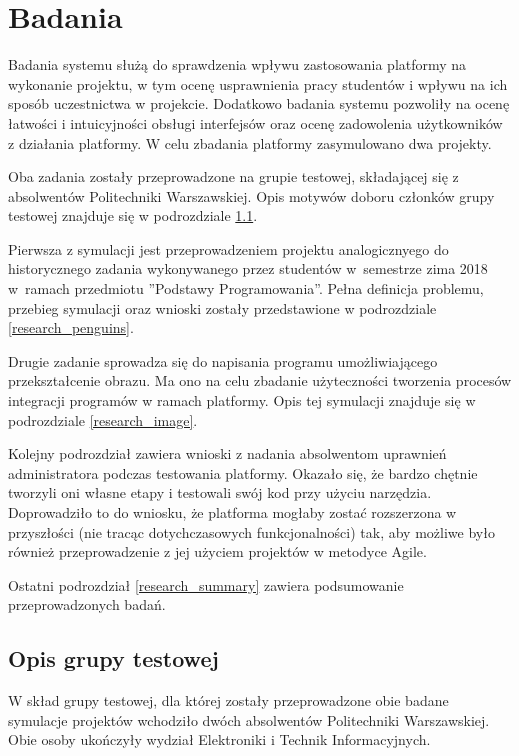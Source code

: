 \chapter{Badania}
\label{chapter:research}

Badania systemu służą do sprawdzenia wpływu zastosowania platformy na wykonanie projektu, w tym ocenę usprawnienia pracy studentów i wpływu na ich sposób uczestnictwa w projekcie.
Dodatkowo badania systemu pozwoliły na ocenę łatwości i intuicyjności obsługi interfejsów oraz ocenę zadowolenia użytkowników z działania platformy.
W celu zbadania platformy zasymulowano dwa projekty.

Oba zadania zostały przeprowadzone na grupie testowej, składającej się z absolwentów Politechniki Warszawskiej.
Opis motywów doboru członków grupy testowej znajduje się w podrozdziale \ref{research_group}.

Pierwsza z symulacji jest przeprowadzeniem projektu analogicznyego do historycznego zadania wykonywanego przez studentów w~semestrze zima 2018 w~ramach przedmiotu ”Podstawy Programowania”.
Pełna definicja problemu, przebieg symulacji oraz wnioski zostały przedstawione w podrozdziale \ref{research_penguins}.

Drugie zadanie sprowadza się do napisania programu umożliwiającego przekształcenie obrazu.
Ma ono na celu zbadanie użyteczności tworzenia procesów integracji programów w ramach platformy.
Opis tej symulacji znajduje się w podrozdziale \ref{research_image}.

Kolejny podrozdział zawiera wnioski z nadania absolwentom uprawnień administratora podczas testowania platformy.
Okazało się, że bardzo chętnie tworzyli oni własne etapy i testowali swój kod przy użyciu narzędzia.
Doprowadziło to do wniosku, że platforma mogłaby zostać rozszerzona w przyszłości (nie tracąc dotychczasowych funkcjonalności) tak, aby możliwe było również przeprowadzenie z jej użyciem projektów w metodyce Agile.

Ostatni podrozdział \ref{research_summary} zawiera podsumowanie przeprowadzonych badań.


\section{Opis grupy testowej}
\label{research_group}

W skład grupy testowej, dla której zostały przeprowadzone obie badane symulacje projektów wchodziło dwóch absolwentów Politechniki Warszawskiej.
Obie osoby ukończyły wydział Elektroniki i Technik Informacyjnych.

